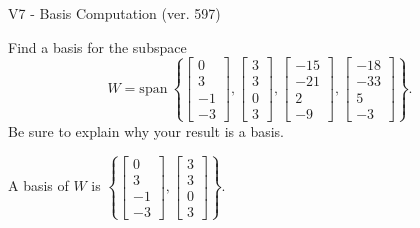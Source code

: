 \begin{exercise}
  \begin{exerciseTitle}V7 - Basis Computation (ver. 597)\end{exerciseTitle}
  \begin{exerciseStatement}
    Find a basis for the subspace 
\[W=\mathrm{span}\ \left\{\left[\begin{array}{r}
0 \\
3 \\
-1 \\
-3
\end{array}\right] , \left[\begin{array}{r}
3 \\
3 \\
0 \\
3
\end{array}\right] , \left[\begin{array}{r}
-15 \\
-21 \\
2 \\
-9
\end{array}\right] , \left[\begin{array}{r}
-18 \\
-33 \\
5 \\
-3
\end{array}\right]\right\}.\]
 Be sure to explain why your result is a basis.


  \end{exerciseStatement}
  \begin{exerciseAnswer}
   A basis of \(W\) is  \(\left\{\left[\begin{array}{r}
0 \\
3 \\
-1 \\
-3
\end{array}\right] , \left[\begin{array}{r}
3 \\
3 \\
0 \\
3
\end{array}\right]\right\}\).
  


  \end{exerciseAnswer}
\end{exercise}